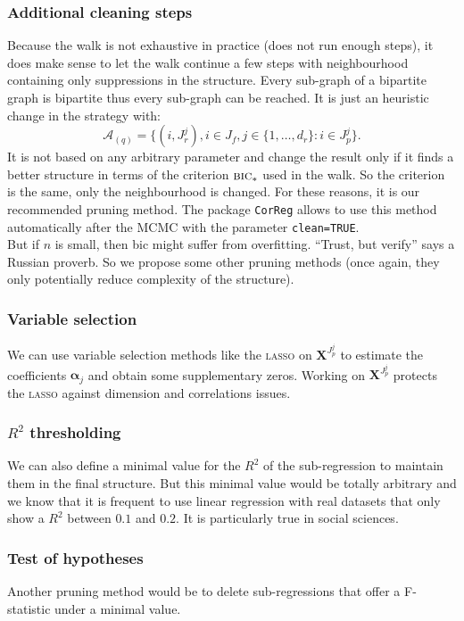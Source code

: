 \documentclass[12pt,a4paper]{report}
\begin{document}
\subsubsection{Additional cleaning steps}
			Because the walk is not exhaustive in practice (does not run enough steps), it does make sense to let the walk continue a few steps with neighbourhood containing only suppressions in the structure. Every sub-graph of a bipartite graph is bipartite thus every sub-graph can be reached. It is just an heuristic change in the strategy with:
			\begin{equation}
				\mathcal{A}_{(q)}=\{(i,J_r^j), i \in J_f, j \in \{1,\dots,d_r \}: i \in J_p^j \}. \nonumber 
			\end{equation}
			It is not based on any arbitrary parameter and change the result only if it finds a better structure in terms of the criterion $\mbox{{\sc bic}}_*$ used in the walk. So the criterion is the same, only the neighbourhood is changed.
			For these reasons, it is our recommended pruning method. The package {\tt CorReg} allows to use this method automatically after the MCMC with the parameter {\tt clean=TRUE}.\\
			
			But if $n$ is small, then {\sc bic} might suffer from overfitting. ``Trust, but verify'' says a Russian proverb. So we propose some other pruning methods (once again, they only potentially reduce complexity of the structure).
		
		\subsubsection{Variable selection}
			We can use variable selection methods like the \textsc{lasso} on $\boldsymbol{X}^{J_p^j}$ to estimate the coefficients $\boldsymbol{\alpha}_j$ and obtain some supplementary zeros. Working on $\boldsymbol{X}^{J_p^j}$ protects the \textsc{lasso} against dimension and correlations issues.
		\subsubsection{$R^2$ thresholding }
			We can also define a minimal value for the $R^2$ of the sub-regression to maintain them in the final structure. But this minimal value would be totally arbitrary and we know that it is frequent to use linear regression with real datasets that only show a $R^2$ between $0.1$ and $0.2$. It is particularly true in social sciences.
		\subsubsection{Test of hypotheses}
			Another pruning method would be to delete sub-regressions that offer a F-statistic under a minimal value.
		
\end{document}
